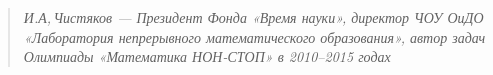 \begin{quote}
\it И.А,\,Чистяков — Президент Фонда «Время науки», директор ЧОУ ОиДО «Лаборатория непрерывного математического образования», автор задач Олимпиады «Математика НОН-СТОП» в 2010–2015 годах
\end{quote}